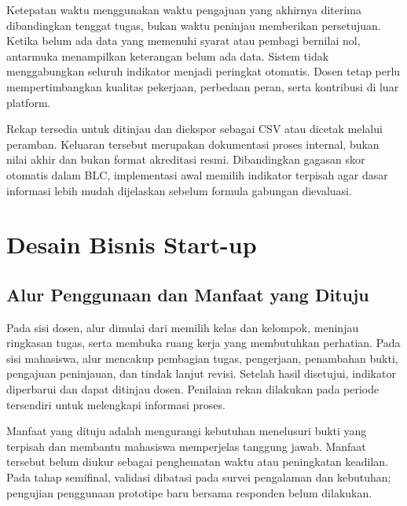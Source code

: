 \documentclass[12pt,a4paper,oneside]{report}
\begin{document}
Ketepatan waktu menggunakan waktu pengajuan yang akhirnya diterima dibandingkan tenggat tugas, bukan waktu peninjau memberikan persetujuan. Ketika belum ada data yang memenuhi syarat atau pembagi bernilai nol, antarmuka menampilkan keterangan belum ada data. Sistem tidak menggabungkan seluruh indikator menjadi peringkat otomatis. Dosen tetap perlu mempertimbangkan kualitas pekerjaan, perbedaan peran, serta kontribusi di luar platform.

Rekap tersedia untuk ditinjau dan diekspor sebagai CSV atau dicetak melalui peramban. Keluaran tersebut merupakan dokumentasi proses internal, bukan nilai akhir dan bukan format akreditasi resmi. Dibandingkan gagasan skor otomatis dalam BLC, implementasi awal memilih indikator terpisah agar dasar informasi lebih mudah dijelaskan sebelum formula gabungan dievaluasi.

\section{Desain Bisnis Start-up}
\subsection{Alur Penggunaan dan Manfaat yang Dituju}
Pada sisi dosen, alur dimulai dari memilih kelas dan kelompok, meninjau ringkasan tugas, serta membuka ruang kerja yang membutuhkan perhatian. Pada sisi mahasiswa, alur mencakup pembagian tugas, pengerjaan, penambahan bukti, pengajuan peninjauan, dan tindak lanjut revisi. Setelah hasil disetujui, indikator diperbarui dan dapat ditinjau dosen. Penilaian rekan dilakukan pada periode tersendiri untuk melengkapi informasi proses.

Manfaat yang dituju adalah mengurangi kebutuhan menelusuri bukti yang terpisah dan membantu mahasiswa memperjelas tanggung jawab. Manfaat tersebut belum diukur sebagai penghematan waktu atau peningkatan keadilan. Pada tahap semifinal, validasi dibatasi pada survei pengalaman dan kebutuhan; pengujian penggunaan prototipe baru bersama responden belum dilakukan.
\end{document}
